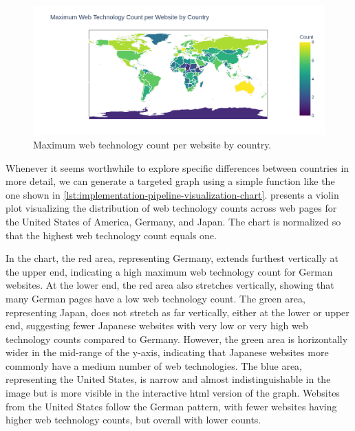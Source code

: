 \begin{figure}[H]
    \centering
    \includegraphics[width=\textwidth]{figures/charts/large/chart_fact_web_technology_choropleth_maximum.png}
    \caption{Maximum web technology count per website by country.}
    \label{fig:analysis-dataset-chart_fact_web_technology_choropleth_maximum}
\end{figure}

Whenever it seems worthwhile to explore specific differences between countries in more detail, we can generate a targeted graph using a simple function like the one shown in \cref{lst:implementation-pipeline-visualization-chart}.
 presents a violin plot visualizing the distribution of web technology counts across web pages for the United States of America, Germany, and Japan.
The chart is normalized so that the highest web technology count equals one.

In the chart, the red area, representing Germany, extends furthest vertically at the upper end, indicating a high maximum web technology count for German websites.
At the lower end, the red area also stretches vertically, showing that many German pages have a low web technology count.
The green area, representing Japan, does not stretch as far vertically, either at the lower or upper end, suggesting fewer Japanese websites with very low or very high web technology counts compared to Germany.
However, the green area is horizontally wider in the mid-range of the y-axis, indicating that Japanese websites more commonly have a medium number of web technologies.
The blue area, representing the United States, is narrow and almost indistinguishable in the image but is more visible in the interactive \ac{html} version of the graph.
Websites from the United States follow the German pattern, with fewer websites having higher web technology counts, but overall with lower counts.

